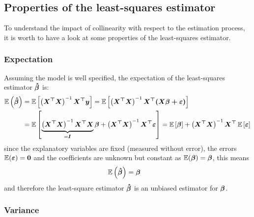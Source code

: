 \documentclass[11pt,a4paper,twoside]{book}\usepackage[]{graphicx}\usepackage[]{xcolor}
\begin{document}
\subsection*{Properties of the least-squares estimator}\label{sec:prop}
To understand the impact of collinearity with respect to the estimation process, it is worth to have a look at some properties of the least-squares estimator.
\subsubsection{Expectation}
Assuming the model is well specified, the expectation of the least-squares estimator ${\boldsymbol{\hat\beta}}$ is:
\begin{align*}
\operatorname{\mathbb{E}}\left({\boldsymbol{\hat\beta}}\right)&=\operatorname{\mathbb{E}}\left[\left(\boldsymbol{X^\top X}\right)^{-1}\boldsymbol{X^\top y} \right]=\operatorname{\mathbb{E}}\left[\left(\boldsymbol{X^\top X}\right)^{-1}\boldsymbol{X^\top (\boldsymbol{X\beta}+\boldsymbol{\varepsilon})} \right]\\
&=\operatorname{\mathbb{E}}\left[\underbrace{\left(\boldsymbol{X^\top X}\right)^{-1}\boldsymbol{X^\top}\boldsymbol{X}}_{=\boldsymbol{I}}\boldsymbol{\beta}+ \left(\boldsymbol{X^\top X}\right)^{-1}\boldsymbol{X^\top}\boldsymbol{\varepsilon}\right]=\operatorname{\mathbb{E}}\left[\boldsymbol{\beta}\right]+ \left(\boldsymbol{X^\top X}\right)^{-1}\boldsymbol{X^\top}\operatorname{\mathbb{E}}\left[\boldsymbol{\varepsilon}\right]
\end{align*}
since the explanatory variables are fixed (measured without error), the errors $\operatorname{\mathbb{E}}(\boldsymbol{\varepsilon})=\boldsymbol{0}$ and the coefficients are unknown but constant as $\operatorname{\mathbb{E}}({\boldsymbol{\beta}})={\boldsymbol{\beta}}$, this means
\begin{align}
\operatorname{\mathbb{E}}\left({\boldsymbol{\hat\beta}}\right)&={\boldsymbol{\beta}} \label{eq:expectation}
\end{align}
and therefore the least-square estimator ${\boldsymbol{\hat\beta}}$ is an unbiased estimator for ${\boldsymbol{\beta}}$.

\subsubsection{Variance}
\end{document}
